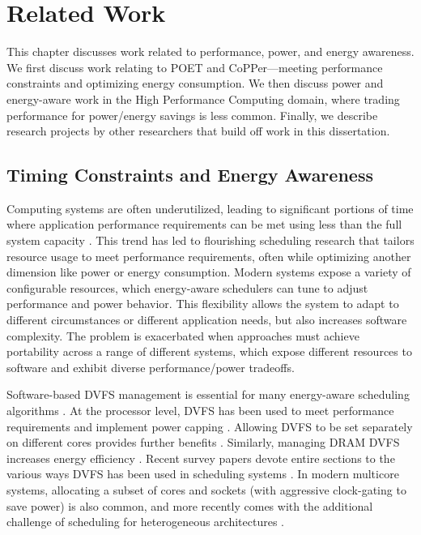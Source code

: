 \chapter{Related Work}
\label{sec:related}

This chapter discusses work related to performance, power, and energy awareness.
We first discuss work relating to POET and CoPPer---meeting performance constraints and optimizing energy consumption.
We then discuss power and energy-aware work in the High Performance Computing domain, where trading performance for power/energy savings is less common.
Finally, we describe research projects by other researchers that build off work in this dissertation.


\section{Timing Constraints and Energy Awareness}

Computing systems are often underutilized, leading to significant portions of time where application performance requirements can be met using less than the full system capacity \cite{google,MeisnerISCA2011}.
This trend has led to flourishing scheduling research that tailors resource usage to meet performance requirements, often while optimizing another dimension like power or energy consumption.
Modern systems expose a variety of configurable resources, which energy-aware schedulers can tune to adjust performance and power behavior.
This flexibility allows the system to adapt to different circumstances or different application needs, but also increases software complexity.
The problem is exacerbated when approaches must achieve portability across a range of different systems, which expose different resources to software and exhibit diverse performance/power tradeoffs.

Software-based DVFS management is essential for many energy-aware scheduling algorithms \cite{Albers,YDS,Kumar2014}.
At the processor level, DVFS has been used to meet performance requirements \cite{Lu2002,Wu2004} and implement power capping \cite{lefurgy2008power}.
Allowing DVFS to be set separately on different cores provides further benefits \cite{Isci2006,Rangan2009}.
Similarly, managing DRAM DVFS increases energy efficiency \cite{MemScale,Diniz2007}.
Recent survey papers devote entire sections to the various ways DVFS has been used in scheduling systems \cite{MittalSurvey,ZhuralevSurvey}.
In modern multicore systems, allocating a subset of cores and sockets (with aggressive clock-gating to save power) is also common, and more recently comes with the additional challenge of scheduling for heterogeneous architectures \cite{Petrucci2012}.

